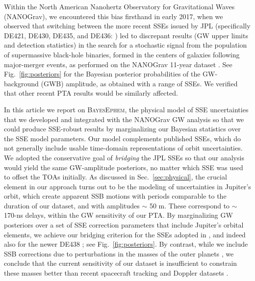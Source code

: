 \documentclass{aastex63}
\begin{document}
Within the North American Nanohertz Observatory for Gravitational Waves (NANOGrav), we encountered this bias firsthand in early 2017, when we observed that switching between the more recent SSEs issued by JPL (specifically DE421, DE430, DE435, and DE436: \citealt{2009IPNPR.178C...1F,2014IPNPR.196C...1F,de435,de436}) led to discrepant results (GW upper limits and detection statistics) in the search for a stochastic signal from the population of supermassive black-hole binaries, formed in the centers of galaxies following major-merger events, as performed on the NANOGrav 11-year dataset \citep{2018ApJS..235...37A,2018ApJ...859...47A}.
See Fig.\ \ref{fig:posteriors} for the Bayesian posterior probabilities of the GW-background (GWB) amplitude, as obtained with a range of SSEs. We verified that other recent PTA results \citep{2015Sci...349.1522S,2016ApJ...821...13A} would be similarly affected.

In this article we report on \textsc{BayesEphem}, the physical model of SSE uncertainties that we developed and integrated with the NANOGrav GW analysis so that we could produce SSE-robust results \citep{2018ApJ...859...47A} by marginalizing our Bayesian statistics over the SSE model parameters. 
Our model complements published SSEs, which do not generally include usable time-domain representations of orbit uncertainties.
We adopted the conservative goal of \emph{bridging} the JPL SSEs so that our analysis would yield the same GW-amplitude posteriors, no matter which SSE was used to offset the TOAs initially.
As discussed in Sec.\ \ref{sec:physical}, the crucial element in our approach turns out to be the modeling of uncertainties in Jupiter's orbit, which create apparent SSB motions with periods comparable to the duration of our dataset, and with amplitudes $\sim$ 50 m. These correspond to $\sim$ 170-ns delays, within the GW sensitivity of our PTA.
By marginalizing GW posteriors over a set of SSE correction parameters that include Jupiter's orbital elements, we achieve our bridging criterion for the SSEs adopted in \cite{2018ApJ...859...47A}, and indeed also for the newer DE438 \citep{de438}; see Fig.\ \ref{fig:posteriors}.
By contrast, while we include SSB corrections due to perturbations in the masses of the outer planets \citep{2010ApJ...720L.201C}, we conclude that the current sensitivity of our dataset is insufficient to constrain these masses better than recent spacecraft tracking and Doppler datasets \citep{jh+2000,2018MNRAS.481.5501C,2006AJ....132.2520J,2014AJ....148...76J,2009AJ....137.4322J}.
\end{document}
